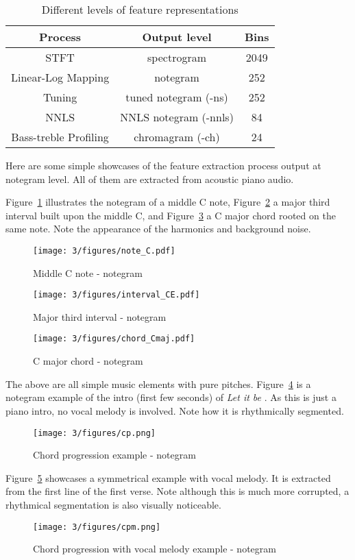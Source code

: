 \begin{table}[htb]
\caption{Different levels of feature representations}
\centering
\footnotesize
\begin{tabular}{|c|c|c|} \hline
 Process & Output level & Bins \\ \hline
 STFT & spectrogram & 2049 \\ \hline
 Linear-Log Mapping & notegram & 252  \\ \hline
 Tuning & tuned notegram (-ns) & 252 \\ \hline
 NNLS & NNLS notegram (-nnls) & 84  \\ \hline
 Bass-treble Profiling & chromagram (-ch) & 24 \\ \hline
\end{tabular}
\label{tab:3-felevels}
\end{table}

Here are some simple showcases of the feature extraction process output at notegram level. All of them are extracted from acoustic piano audio.

Figure~\ref{fig:3-note_C} illustrates the notegram of a middle C note, Figure~\ref{fig:3-interval_CE} a major third interval built upon the middle C, and Figure~\ref{fig:3-chord_Cmaj} a C major chord rooted on the same note. Note the appearance of the harmonics and background noise.

\begin{figure}
\centering
\texttt{[image: 3/figures/note\_C.pdf]}
\caption{Middle C note - notegram}
\label{fig:3-note_C}
\end{figure}

\begin{figure}
\centering
\texttt{[image: 3/figures/interval\_CE.pdf]}
\caption{Major third interval - notegram}
\label{fig:3-interval_CE}
\end{figure}

\begin{figure}
\centering
\texttt{[image: 3/figures/chord\_Cmaj.pdf]}
\caption{C major chord - notegram}
\label{fig:3-chord_Cmaj}
\end{figure}

The above are all simple music elements with pure pitches. Figure~\ref{fig:3-cp} is a notegram example of the intro (first few seconds) of {\it Let it be} . As this is just a piano intro, no vocal melody is involved. Note how it is rhythmically segmented.
\begin{figure}
\centering
\texttt{[image: 3/figures/cp.png]}
\caption{Chord progression example - notegram}
\label{fig:3-cp}
\end{figure}
Figure~\ref{fig:3-cpm} showcases a symmetrical example with vocal melody. It is extracted from the first line of the first verse. Note although this is much more corrupted, a rhythmical segmentation is also visually noticeable.
\begin{figure}
\centering
\texttt{[image: 3/figures/cpm.png]}
\caption{Chord progression with vocal melody example - notegram}
\label{fig:3-cpm}
\end{figure}

